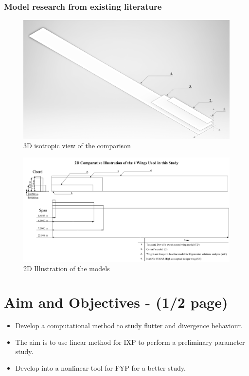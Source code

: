 \documentclass[11pt]{article}
\begin{document}
\subsubsection{Model research from existing literature}
\begin{figure}[H]
    \centering
    \includegraphics[width=.9\textwidth]{figures/iso-view.png}
    \caption{3D isotropic view of the comparison}
    \label{fig:3D-wings}
\end{figure}

\begin{figure}[H]
    \centering
    \includegraphics[width = \textwidth]{figures/para.png}
    \caption{2D Illustration of the models}
    \label{fig:2D-wings}
\end{figure}

\section{Aim and Objectives - (1/2 page)}
\begin{itemize}
    \item Develop a computational method to study flutter and divergence behaviour.
    \item The aim is to use linear method for IXP to perform a preliminary parameter study.
    \item Develop into a nonlinear tool for FYP for a better study.
\end{itemize}
\end{document}
